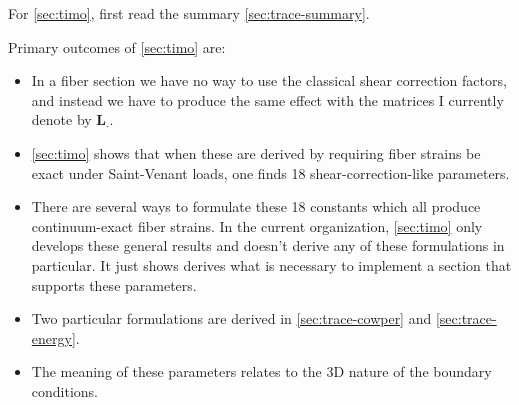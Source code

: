 

\begin{Note}
For \cref{sec:timo}, first read the summary \cref{sec:trace-summary}.

Primary outcomes of \cref{sec:timo} are:
\begin{itemize}
    \item In a fiber section we have no way to use the classical shear correction factors, and instead we have to produce the same effect with the matrices I currently denote by \(\mathbf{L}_{\cdot}\).
    \item \cref{sec:timo} shows that when these are derived by requiring fiber strains be exact under Saint-Venant loads, one finds 18 shear-correction-like parameters. 
    \item There are several ways to formulate these 18 constants which all produce continuum-exact fiber strains. In the current organization, \cref{sec:timo} only develops these general results and doesn't derive any of these formulations in particular. It just shows derives what is necessary to implement a section that supports these parameters.
    \item Two particular formulations are derived in \cref{sec:trace-cowper} and \cref{sec:trace-energy}.
    \item The meaning of these parameters relates to the 3D nature of the boundary conditions. 
\end{itemize}
\end{Note}